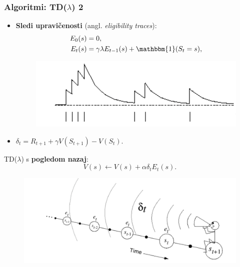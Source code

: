 \documentclass{beamer}    %
\begin{document}
\begin{frame}
    \frametitle{Algoritmi: TD($\lambda$) 2}
    \begin{itemize}
        \item \textbf{Sledi upravičenosti} (angl. \textit{eligibility traces}):
        \begin{align*}
            E_0(s) &= 0, \\
            E_t(s) &= \gamma \lambda E_{t-1}(s) + \mathbbm{1}(S_t = s),
        \end{align*}
    \begin{figure}
        \includegraphics[scale=0.25]{slike/et.png}
    \end{figure}
        \pause
        \item $\delta_t = R_{t+1} + \gamma V(S_{t+1}) - V(S_t).$
    \end{itemize}

    \medskip
    \medskip
    \medskip
    TD($\lambda$) s \textbf{pogledom nazaj}: 
    $$
    V(s) \leftarrow V(s) + \alpha \delta_t E_t(s).
    $$
    \begin{figure}[b]
        \includegraphics[scale=0.35]{slike/pogled-nazaj.png}
    \end{figure}
\end{frame}
\end{document}
